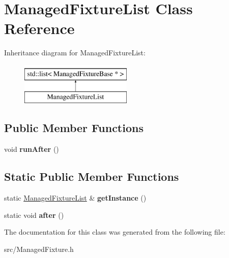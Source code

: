 \hypertarget{class_managed_fixture_list}{\section{Managed\-Fixture\-List Class Reference}
\label{class_managed_fixture_list}
}
Inheritance diagram for Managed\-Fixture\-List\-:\begin{figure}[H]
\begin{center}
\leavevmode
\includegraphics[height=2.000000cm]{class_managed_fixture_list}
\end{center}
\end{figure}
\subsection*{Public Member Functions}
\begin{DoxyCompactItemize}
\item 
\hypertarget{class_managed_fixture_list_a2207d39258eca7da9c23285d842afd7c}{void {\bfseries run\-After} ()}\label{class_managed_fixture_list_a2207d39258eca7da9c23285d842afd7c}

\end{DoxyCompactItemize}
\subsection*{Static Public Member Functions}
\begin{DoxyCompactItemize}
\item 
\hypertarget{class_managed_fixture_list_af9ab06bcb01ff5ef5c0e9209e44571ba}{static \hyperlink{class_managed_fixture_list}{Managed\-Fixture\-List} \& {\bfseries get\-Instance} ()}\label{class_managed_fixture_list_af9ab06bcb01ff5ef5c0e9209e44571ba}

\item 
\hypertarget{class_managed_fixture_list_aaf83b7c44d10c01f26b7befd8297d567}{static void {\bfseries after} ()}\label{class_managed_fixture_list_aaf83b7c44d10c01f26b7befd8297d567}

\end{DoxyCompactItemize}


The documentation for this class was generated from the following file\-:\begin{DoxyCompactItemize}
\item 
src/Managed\-Fixture.\-h\end{DoxyCompactItemize}
